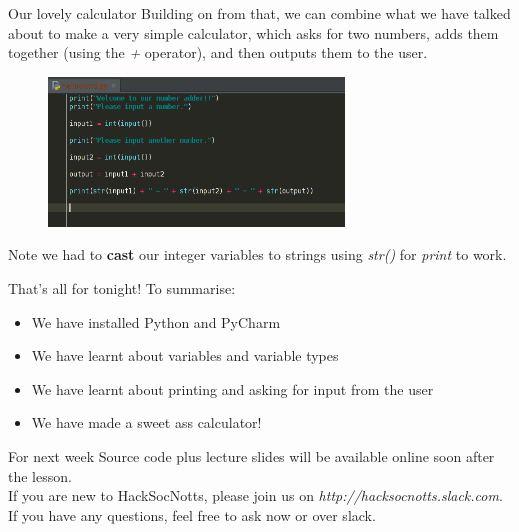 \documentclass{beamer}
\begin{document}
\begin{frame}{Our lovely calculator}
Building on from that, we can combine what we have talked about to make a very simple calculator, which asks for two numbers, adds them together (using the \textit{+} operator), and then outputs them to the user.
\pause
\begin{figure}[h]
\includegraphics[width=0.7\textwidth]{calc}
\end{figure}
\pause
Note we had to \textbf{cast} our integer variables to strings using \textit{str()} for \textit{print} to work.
\end{frame}

\begin{frame}{That's all for tonight!}
  To summarise:
  \begin{itemize}
  \item We have installed Python and PyCharm
  \item We have learnt about variables and variable types
  \item We have learnt about printing and asking for input from the user
  \item We have made a sweet ass calculator!
  \end{itemize}
\end{frame}

\begin{frame}{For next week}
Source code plus lecture slides will be available online soon after the lesson.\\
If you are new to HackSocNotts, please join us on \textit{http://hacksocnotts.slack.com}.\\
If you have any questions, feel free to ask now or over slack.\\
\end{frame}
\end{document}
